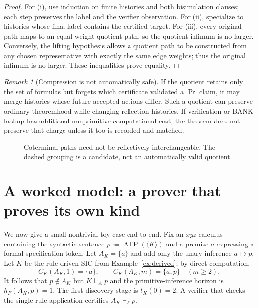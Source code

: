 \documentclass[11pt,letterpaper]{article}
\theoremstyle{definition}\newtheorem{definition}[theorem]{Definition}\newtheorem{example}[theorem]{Example}\newtheorem{protocol}[theorem]{Protocol}\newtheorem{question}[theorem]{Open Problem}
\theoremstyle{remark}\newtheorem{remark}[theorem]{Remark}
\newcommand{\Prov}{\operatorname{Pr}}
\begin{document}
\begin{proof}
For (i), use induction on finite histories and both bisimulation clauses; each step preserves the label and the verifier observation. For (ii), specialize to histories whose final label contains the certified target. For (iii), every original path maps to an equal-weight quotient path, so the quotient infimum is no larger. Conversely, the lifting hypothesis allows a quotient path to be constructed from any chosen representative with exactly the same edge weights; thus the original infimum is no larger. These inequalities prove equality.
\end{proof}
\begin{remark}[Compression is not automatically safe]
If the quotient retains only the set of formulas but forgets which certificate validated a $\Prov$ claim, it may merge histories whose future accepted actions differ. Such a quotient can preserve ordinary theoremhood while changing reflection histories. If verification or BANK lookup has additional nonprimitive computational cost, the theorem does not preserve that charge unless it too is recorded and matched.
\end{remark}
\begin{figure}[htbp]\centering
{}
\caption{Coterminal paths need not be reflectively interchangeable. The dashed grouping is a candidate, not an automatically valid quotient.}
\end{figure}

\section{A worked model: a prover that proves its own kind}
We now give a small nontrivial toy case end-to-end. Fix an $xyz$ calculus containing the syntactic sentence $p:=\operatorname{ATP}(\langle K\rangle)$ and a premise $a$ expressing a formal specification token. Let $A_K=\{a\}$ and add only the unary inference $a\mapsto p$. Let $K$ be the rule-driven SIC from Example~\ref{ex:derived}; by direct computation,
\[
C_K(A_K,1)=\{a\},\qquad C_K(A_K,m)=\{a,p\}\quad(m\ge2).
\]
It follows that $p\notin A_K$ but $K\vdash_A p$ and the primitive-inference horizon is $h_F(A_K,p)=1$. The first discovery stage is $t_K(0)=2$. A verifier that checks the single rule application certifies $A_K\vdash_F p$.
\end{document}
